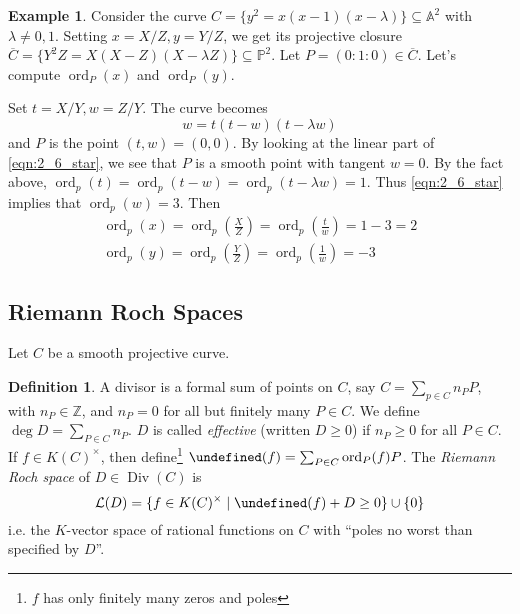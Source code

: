 \documentclass[11pt]{article}
\theoremstyle{definition}
\newtheorem*{definition*}{Definition}
\newtheorem{example}[definition]{Example}
\theoremstyle{plain}
\theoremstyle{remark}
\DeclareMathOperator{\ord}{ord}
\let\div\undefined
\DeclareMathOperator{\div}{div}
\DeclareMathOperator{\Div}{Div}
\newcommand{\ZZ}{\mathbb{Z}}
\newcommand{\PP}{\mathbb{P}}
\newcommand{\bA}{\mathbb{A}}
\newcommand{\cL}{\mathcal{L}}
\begin{document}
\begin{example}\label{eg:2_6}
    Consider the curve $C = \{y^2 = x(x-1)(x-\lambda)\} \subseteq \bA^2$ with $\lambda \neq 0, 1$. Setting $x=X/Z, y=Y/Z$, we get its projective closure $\overline{C} = \{Y^2 Z = X (X-Z) (X-\lambda Z)\} \subseteq \PP^2$. Let $P = (0 : 1 : 0) \in \overline{C}$. Let's compute $\ord_P(x)$ and $\ord_P(y)$.

    Set $t=X/Y, w=Z/Y$. The curve becomes
    \begin{equation}\label{eqn:2_6_star}
        w = t(t-w)(t-\lambda w)
    \end{equation}
    and $P$ is the point $(t,w)=(0,0)$. By looking at the linear part of \eqref{eqn:2_6_star}, we see that $P$ is a smooth point with tangent $w = 0$. By the fact above, $\ord_p(t)=\ord_p(t-w)=\ord_p(t-\lambda w)=1$. Thus \eqref{eqn:2_6_star} implies that $\ord_p(w) = 3$. Then
    \begin{gather*}
        \ord_p(x) = \ord_p\left(\frac{X}{Z}\right) = \ord_p\left(\frac{t}{w}\right) = 1-3 = 2\\
        \ord_p(y) = \ord_p\left(\frac{Y}{Z}\right) = \ord_p\left(\frac{1}{w}\right) = -3
    \end{gather*}
\end{example}

\subsection{Riemann Roch Spaces}

Let $C$ be a smooth projective curve.

\begin{definition*}
    A divisor is a formal sum of points on $C$, say $C = \sum_{p \in C} n_P P$, with $n_P \in \ZZ$, and $n_P = 0$ for all but finitely many $P \in C$. We define $\deg D = \sum_{P \in C} n_P$. $D$ is called \emph{effective} (written $D \ge 0$) if $n_P \ge 0$ for all $P \in C$. If $f \in K(C)^\times$, then define\footnote{$f$ has only finitely many zeros and poles} $\div(f) = \sum_{P \in C} \ord_P(f) P$. The \emph{Riemann Roch space} of $D \in \Div(C)$ is
    \begin{equation*}
        \cL(D) = \{f \in K(C)^\times \mid \div(f) + D \ge 0\} \cup \{0\}
    \end{equation*}
    i.e. the $K$-vector space of rational functions on $C$ with ``poles no worst than specified by $D$''.
\end{definition*}
\end{document}
